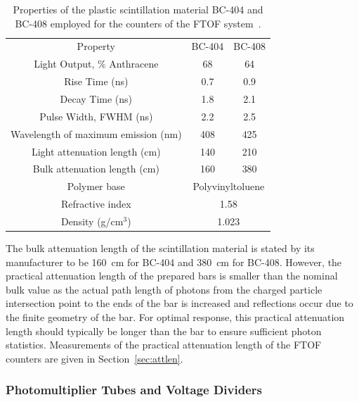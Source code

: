 \documentclass[3p,times,twocolumn]{elsarticle}
\begin{document}
\begin{table}[t]
\begin{center}
\begin{tabular}{c|c|c} \hline
Property                                    & BC-404     & BC-408  \\    
Light Output, \% Anthracene  & 68             &  64    \\ 
Rise Time (ns)                           & 0.7             & 0.9    \\ 
Decay Time (ns)                         & 1.8             & 2.1     \\ 
Pulse Width, FWHM (ns)         & 2.2              & 2.5    \\ 
Wavelength of maximum emission (nm) & 408    & 425 \\ 
Light attenuation length (cm)   & 140             & 210   \\ 
Bulk attenuation length (cm)     & 160             & 380  \\ 
Polymer base                             & \multicolumn{2}{c}{Polyvinyltoluene} \\ 
Refractive index                       & \multicolumn{2}{c}{1.58}                    \\  
Density (g/cm$^3$)                  & \multicolumn{2}{c}{1.023}                    \\ \hline 
\end{tabular}
\end{center}
\caption{Properties of the plastic scintillation material BC-404 and BC-408 employed for the counters
of the FTOF system~\cite{scint-mat-ref}.}
\label{scint-specs}
\end{table}

The bulk attenuation length of the scintillation material is stated by its manufacturer to be 160~cm
for BC-404 and 380~cm for BC-408. However, the practical attenuation length of the prepared bars
is smaller than the nominal bulk value as the actual path length of photons from the charged particle
intersection point to the ends of the bar is increased and reflections occur due to the finite geometry
of the bar. For optimal response, this practical attenuation length should typically be longer than the
bar to ensure sufficient photon statistics. Measurements of the practical attenuation length of the
FTOF counters are given in Section~\ref{sec:attlen}.

\subsubsection{Photomultiplier Tubes and Voltage Dividers}
\end{document}
